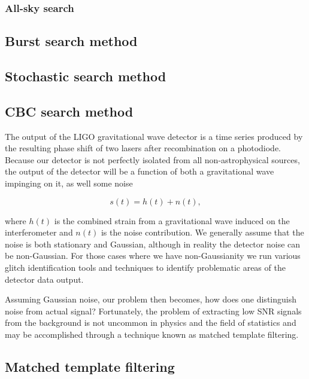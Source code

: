 \subsubsection{All-sky search}

\subsection{Burst search method}

\subsection{Stochastic search method}

\subsection{\ac{CBC} search method}

The output of the \ac{LIGO} gravitational wave detector is a time series produced by the resulting phase shift of two lasers after recombination on a photodiode. Because our detector is not perfectly isolated from all non-astrophysical sources, the output of the detector will be a function of both a gravitational wave impinging on it, as well some noise

\begin{equation}
    s(t) = h(t) + n(t),
\end{equation}{}

where $h(t)$ is the combined strain from a gravitational wave induced on the interferometer and $n(t)$ is the noise contribution. We generally assume that the noise is both stationary and Gaussian, although in reality the detector noise can be non-Gaussian. For those cases where we have non-Gaussianity we run various glitch identification tools and techniques to identify problematic areas of the detector data output. 

Assuming Gaussian noise, our problem then becomes, how does one distinguish noise from actual signal? Fortunately, the problem of extracting low \ac{SNR} signals from the background is not uncommon in physics and the field of statistics and may be accomplished through a technique known as matched template filtering.

\subsection{Matched template filtering}

